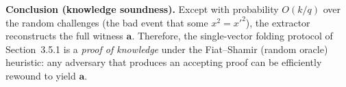 \documentclass[11pt,a4paper]{article}
\begin{document}
\medskip
\textbf{Conclusion (knowledge soundness).}
Except with probability $O(k/q)$ over the random challenges (the bad event that some $x^2={x'}^2$), the extractor reconstructs the full witness $\mathbf{a}$. Therefore, the single-vector folding protocol of Section~3.5.1 is a \emph{proof of knowledge} under the Fiat--Shamir (random oracle) heuristic: any adversary that produces an accepting proof can be efficiently rewound to yield $\mathbf{a}$.
\end{document}

